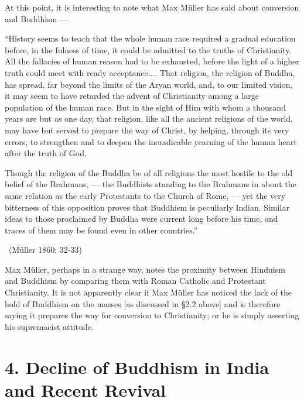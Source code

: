 At this point, it is interesting to note what Max Müller has said about conversion and Buddhism —

\newpage

\begin{myquote}
“History seems to teach that the whole human race required a gradual education before, in the fulness of time, it could be admitted to the truths of Christianity. All the fallacies of human reason had to be exhausted, before the light of a higher truth could meet with ready acceptance.... That religion, the religion of Buddha, has spread, far beyond the limits of the Aryan world, and, to our limited vision, it may seem to have retarded the advent of Christianity among a large population of the human race. But in the sight of Him with whom a thousand years are but as one day, that religion, like all the ancient religions of the world, may have but served to prepare the way of Christ, by helping, through its very errors, to strengthen and to deepen the ineradicable yearning of the human heart after the truth of God.
\end{myquote}

\begin{myquote}
Though the religion of the Buddha be of all religions the most hostile to the old belief of the Brahmans, — the Buddhists standing to the Brahmans in about the same relation as the early Protestants to the Church of Rome, — yet the very bitterness of this opposition proves that Buddhism is peculiarly Indian. Similar ideas to those proclaimed by Buddha were current long before his time, and traces of them may be found even in other countries.” 

~\hfill (Müller 1860: 32-33)
\end{myquote}

Max Müller, perhaps in a strange way, notes the proximity between Hinduism and Buddhism by comparing them with Roman Catholic and Protestant Christianity. It is not apparently clear if Max Müller has noticed the lack of the hold of Buddhism on the masses [as discussed in §2.2 above] and is therefore saying it prepares the way for conversion to Christianity; or he is simply asserting his supremacist attitude.

\vspace{-.3cm}

\section*{4. Decline of Buddhism in India \hfill\break and Recent Revival}

